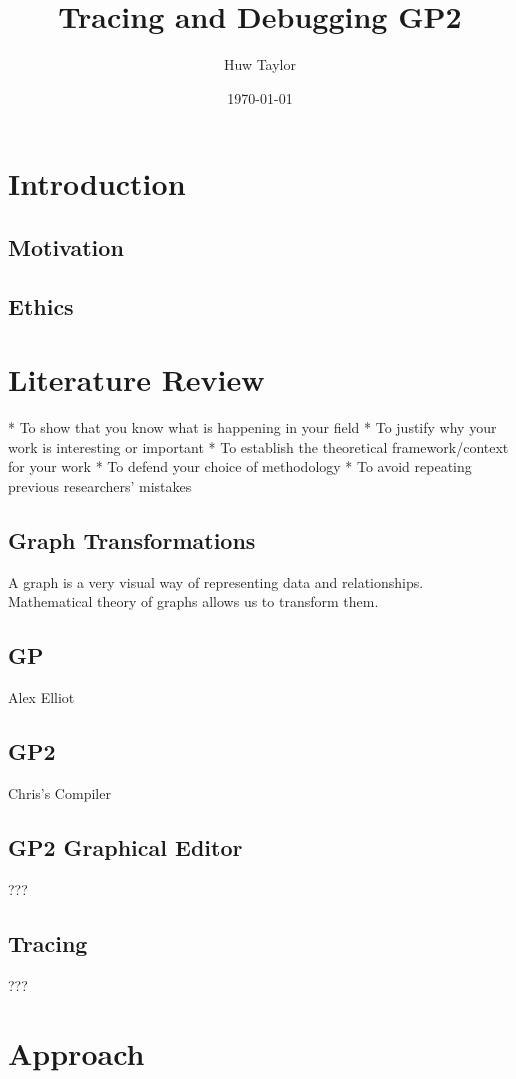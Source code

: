 \documentclass{UoYCSproject}
\author{Huw Taylor}
\title{Tracing and Debugging GP2}
\date{\today}
\begin{document}
\maketitle
\tableofcontents
\listoffigures

\chapter{Introduction}
\section{Motivation}
\section{Ethics}

\chapter{Literature Review}
 * To show that you know what is happening in your field 
 * To justify why your work is interesting or important 
 * To establish the theoretical framework/context for your 
work 
 * To defend your choice of methodology 
 * To avoid repeating previous researchers’ mistakes

\section{Graph Transformations}
A graph is a very visual way of representing data and relationships. 
Mathematical theory of graphs allows us to transform them.
\section{GP}
Alex Elliot
\section{GP2}
Chris's Compiler
\section{GP2 Graphical Editor}
???
\section{Tracing}
???

\chapter{Approach}
\end{document}
